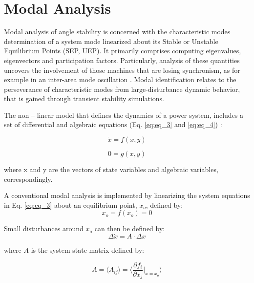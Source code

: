 \documentclass[conference,11pt]{IEEEtran}
\newcommand{\ignore}[2]{\hspace{0in}#2}
\begin{document}
\section{Modal Analysis}\label{s:modal_analysis}
Modal analysis of angle stability is concerned with the characteristic modes determination of a system mode linearized about its  Stable or Unstable Equilibrium Points (SEP, UEP). It primarily comprises computing eigenvalues, eigenvectors and participation factors. Particularly, analysis of these quantities uncovers the involvement of those machines that are losing synchronism, as for example in an inter-area mode oscillation \cite{ref16}. \ignore {While post-disturbance SEPs are generally easy to determine, computation of UEPs has long been considered as a problematic task \cite{ref17} \ignore{ref18}.} Modal identification \ignore{, on the other hand,} relates to the perseverance of characteristic modes from large-disturbance dynamic behavior, that is gained through transient stability simulations.  


The non – linear model that defines the dynamics of a power system, includes a set of differential and algebraic equations (Eq. \ref{eq:eq_3} and \ref{eq:eq_4}) \cite{ref21}: 


\begin{equation}
    \label{eq:eq_3}
    \dot{x} = f(x,y)
\end{equation}

\begin{equation}
    \label{eq:eq_4}
    0 = g(x,y)
\end{equation}

{\setlength{\parindent}{0cm}
where x and y are the vectors of state variables and algebraic variables, correspondingly.}

A conventional modal analysis is implemented by linearizing the system equations in Eq. \ref{eq:eq_3} about an equilibrium point, $x_o$, defined by:
\begin{equation}
    \label{eq:eq_5}
    x_o = f(\dot{x_o}) = 0
\end{equation}

Small disturbances around $x_o$ can then be defined by:
\begin{equation}
    \label{eq:eq_6}
    \Delta\dot{x} = A \cdot \Delta x
\end{equation}

{\setlength{\parindent}{0cm}
where $A$ is the system state matrix defined by:}

\begin{equation}
    \label{eq:eq_7}
    A =  \langle A_{ij} \rangle  =  \langle \dfrac{\partial f_i}{\partial x_j}\vert _{x=x_o} \rangle
\end{equation}
\end{document}
